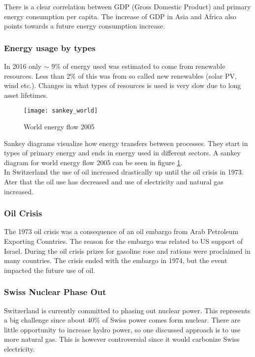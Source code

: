 There is a clear correlation between GDP (Gross Domestic Product) and primary energy consumption per capita. The increase of GDP in Asia and Africa also points towards a future energy consumption increase.

\subsubsection{Energy usage by types}
In 2016 only $\sim$ 9\% of energy used was estimated to come from renewable resources.
Less than 2\% of this was from so called new renewables (solar PV, wind etc.).
Changes in what types of resources is used is very slow due to long asset lifetimes.\\

\begin{figure}
    \centering
    \texttt{[image: sankey\_world]}
    \caption{World energy flow 2005}
    \label{fig:sankey_world}
\end{figure}

Sankey diagrams visualize how energy transfers between processes.
They start in types of primary energy and ends in energy used in different sectors.
A sankey diagram for world energy flow 2005 can be seen in figure \ref{fig:sankey_world}.\\

In Switzerland the use of oil increased drastically up until the oil crisis in 1973.
Ater that the oil use has decreased and use of electricity and natural gas increased.

\subsubsection{Oil Crisis}
The 1973 oil crisis was a consequence of an oil embargo from Arab Petroleum Exporting Countries.
The reason for the embargo was related to US support of Israel.
During the oil crisis prizes for gasoline rose and rations were proclaimed in many countries. The crisis ended with the embargo in 1974, but the event impacted the future use of oil.

\subsubsection{Swiss Nuclear Phase Out}
Switzerland is currently committed to phasing out nuclear power.
This represents a big challenge since about 40\% of Swiss power comes form nuclear.
There are little opportunity to increase hydro power, so one discussed approach is to use more natural gas.
This is however controversial since it would carbonize Swiss electricity.

